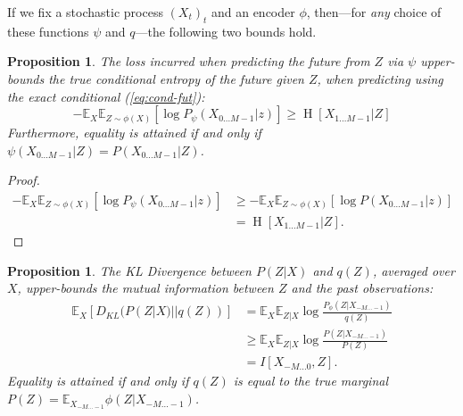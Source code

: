 \documentclass[11pt,letterpaper]{article}
\newcommand{\E}[0]{\mathbb{E}}
\newcounter{theorem}
\newtheorem{proposition}[theorem]{Proposition}
\begin{document}
If we fix a stochastic process $(X_t)_t$ and an encoder $\phi$, then---for \emph{any} choice of these functions $\psi$ and $q$---the following two bounds hold.

\begin{proposition}
The loss incurred when predicting the future from $Z$ via $\psi$ upper-bounds the true conditional entropy of the future given $Z$, when predicting using the exact conditional (\ref{eq:cond-fut}):
\begin{equation}\label{ineq1}
	-	\mathbb{E}_{X}\mathbb{E}_{Z \sim \phi(X)}\left[\log P_\psi(X_{0\dots M-1} | z)\right] \geq \operatorname{H}[X_{1\dots M-1}|Z]
\end{equation}
Furthermore, equality is attained if and only if $\psi(X_{0\dots M-1}|Z) = P(X_{0\dots M-1}|Z)$.
\end{proposition}

\begin{proof}
\begin{align*}
	-	\mathbb{E}_{X}\mathbb{E}_{Z \sim \phi(X)}\left[\log P_\psi(X_{0\dots M-1} | z)\right] & \geq -	\mathbb{E}_{X}\mathbb{E}_{Z \sim \phi(X)}\left[\log P(X_{0\dots M-1} | z)\right]\\
	&= \operatorname{H}[X_{1\dots M-1}|Z].
\end{align*}
\end{proof}

\begin{proposition} 
The KL Divergence between $P(Z|X)$ and $q(Z)$, averaged over $X$, upper-bounds the mutual information between $Z$ and the past observations:
\begin{equation}\label{ineq2}
\begin{aligned}
	\mathbb{E}_{X}\left[ D_{KL}(P(Z|X) || q(Z))\right] &=   \mathbb{E}_{X} \mathbb{E}_{Z|X} \log \frac{P_\phi(Z|X_{-M\dots -1})}{q(Z)}  \\
	& \geq  \mathbb{E}_{X} \mathbb{E}_{Z|X} \log \frac{P(Z|X_{-M\dots -1})}{P(Z)}  \\
	& = I[X_{-M\dots 0},Z].
\end{aligned}
\end{equation}
Equality is attained if and only if $q(Z)$ is equal to the true marginal $P(Z) = \E_{X_{-M \dots -1}} \phi(Z|X_{-M \dots -1})$.
\end{proposition}
\end{document}
